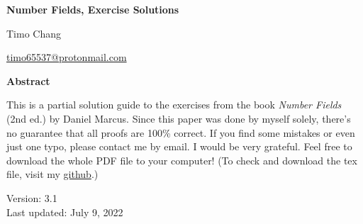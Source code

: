 \documentclass[11pt]{amsbook}
\makeatletter
\theoremstyle{plain}
\theoremstyle{definition}
\theoremstyle{remark}
\newcommand{\myToC}{{
  \renewcommand{\contentsname}{Contents}
  \@starttoc{toc}{\contentsname}
}}
\makeatother
\begin{document}
\begin{titlepage}
\begin{center}
\vspace*{1cm}

\LARGE
\textbf{Number Fields, Exercise Solutions}

\vspace{1.5cm}
\LARGE Timo Chang

\vspace{0.5cm}
\large \url{timo65537@protonmail.com}

\vspace{2cm}
\textbf{Abstract}
\vspace{0.3cm}
\end{center}

This is a partial solution guide to the exercises from the book \textit{Number Fields} (2nd ed.) by Daniel Marcus. Since this paper was done by myself solely, there's no guarantee that all proofs are 100\% correct. If you find some mistakes or even just one typo, please contact me by email. I would be very grateful. Feel free to download the whole PDF file to your computer! (To check and download the tex file, visit my \href{https://github.com/bettertimo/number-fields-solutions}{github}.)

\begin{center}
\vfill

Version: 3.1 \\
Last updated: July 9, 2022
\end{center}

\end{titlepage}

\setcounter{tocdepth}{2}
\myToC





\end{document}
